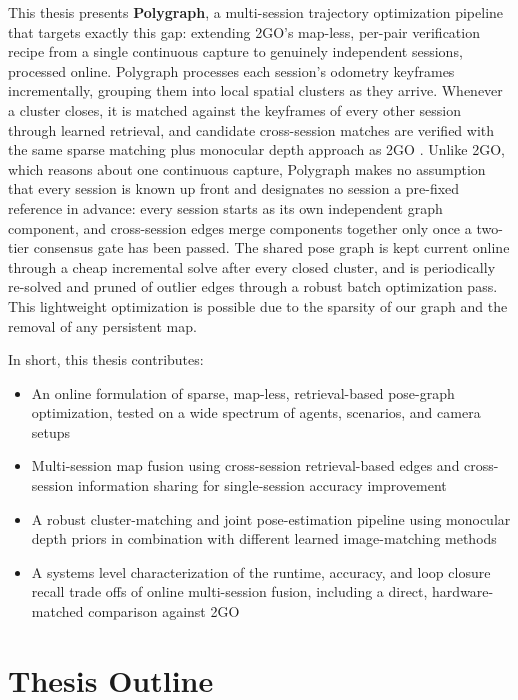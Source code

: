 This thesis presents \textbf{Polygraph}, a multi-session trajectory optimization pipeline that targets exactly this gap: extending 2GO's map-less, per-pair verification recipe from a single continuous capture to genuinely independent sessions, processed online. Polygraph processes each session's odometry keyframes incrementally, grouping them into local spatial clusters as they arrive. Whenever a cluster closes, it is matched against the keyframes of every other session through learned retrieval, and candidate cross-session matches are verified with the same sparse matching plus monocular depth approach as 2GO \cite{lim2025twogo}. Unlike 2GO, which reasons about one continuous capture, Polygraph makes no assumption that every session is known up front and designates no session a pre-fixed reference in advance: every session starts as its own independent graph component, and cross-session edges merge components together only once a two-tier consensus gate has been passed. The shared pose graph is kept current online through a cheap incremental solve after every closed cluster, and is periodically re-solved and pruned of outlier edges through a robust batch optimization pass. This lightweight optimization is possible due to the sparsity of our graph and the removal of any persistent map.

In short, this thesis contributes:
\begin{itemize}
  \item An online formulation of sparse, map-less, retrieval-based pose-graph optimization, tested on a wide spectrum of agents, scenarios, and camera setups
  \item Multi-session map fusion using cross-session retrieval-based edges and cross-session information sharing for single-session accuracy improvement
  \item A robust cluster-matching and joint pose-estimation pipeline using monocular depth priors in combination with different learned image-matching methods
  \item A systems level characterization of the runtime, accuracy, and loop closure recall trade offs of online multi-session fusion, including a direct, hardware-matched comparison against 2GO \cite{lim2025twogo}
\end{itemize}

\section{Thesis Outline}

